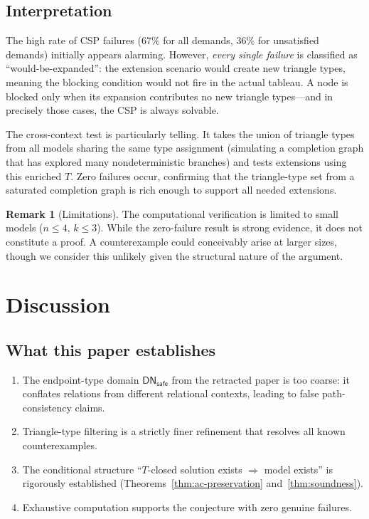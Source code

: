 \documentclass[a4paper,11pt]{article}
\theoremstyle{definition}
\newtheorem{remark}[theorem]{Remark}
\newcommand{\DN}{\ensuremath{\mathsf{DN}}}
\begin{document}
\subsection{Interpretation}

The high rate of CSP failures (67\% for all demands, 36\% for
unsatisfied demands) initially appears alarming.  However,
\emph{every single failure} is classified as ``would-be-expanded'':
the extension scenario would create new triangle types, meaning the
blocking condition would not fire in the actual tableau.  A node is
blocked only when its expansion contributes no new triangle types---and
in precisely those cases, the CSP is always solvable.

The cross-context test is particularly telling.  It takes the union
of triangle types from all models sharing the same type assignment
(simulating a completion graph that has explored many nondeterministic
branches) and tests extensions using this enriched $T$.  Zero failures
occur, confirming that the triangle-type set from a saturated
completion graph is rich enough to support all needed extensions.

\begin{remark}[Limitations]
The computational verification is limited to small models
($n \leq 4$, $k \leq 3$).  While the zero-failure result is strong
evidence, it does not constitute a proof.  A counterexample could
conceivably arise at larger sizes, though we consider this unlikely
given the structural nature of the argument.
\end{remark}


\section{Discussion}
\label{sec:discussion}

\subsection{What this paper establishes}

\begin{enumerate}[nosep]
  \item The endpoint-type domain $\DN_{\mathsf{safe}}$ from the
    retracted paper is too coarse: it conflates relations from
    different relational contexts, leading to false path-consistency
    claims.
  \item Triangle-type filtering is a strictly finer refinement that
    resolves all known counterexamples.
  \item The conditional structure
    ``$T$-closed solution exists $\Rightarrow$ model exists'' is
    rigorously established (Theorems~\ref{thm:ac-preservation}
    and~\ref{thm:soundness}).
  \item Exhaustive computation supports the conjecture with zero
    genuine failures.
\end{enumerate}
\end{document}
